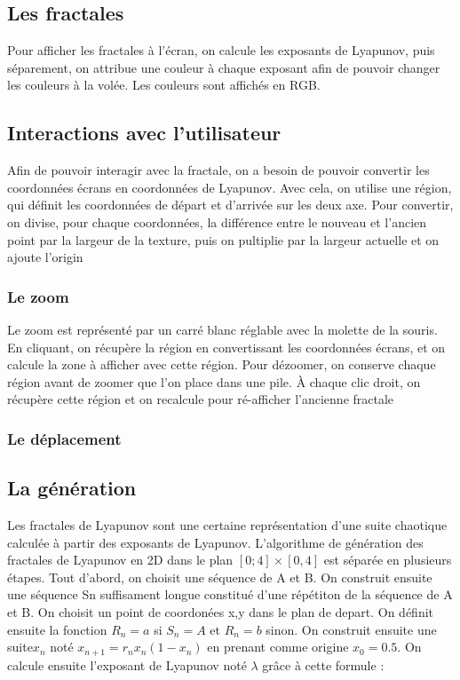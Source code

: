 \documentclass{article}
\begin{document}
    \subsection*{Les fractales}

    Pour afficher les fractales à l'écran, on calcule les exposants de Lyapunov, puis séparement, on attribue une couleur à chaque exposant afin de pouvoir changer les couleurs à la volée.
    Les couleurs sont affichés en RGB.

    \subsection*{Interactions avec l'utilisateur}

    Afin de pouvoir interagir avec la fractale, on a besoin de pouvoir convertir les coordonnées écrans en coordonnées de Lyapunov.
    Avec cela, on utilise une région, qui définit les coordonnées de départ et d'arrivée sur les deux axe.
    Pour convertir, on divise, pour chaque coordonnées, la différence entre le nouveau et l'ancien point par la largeur de la texture, puis on pultiplie par la largeur actuelle et on ajoute l'origin

    \subsubsection*{Le zoom}

    Le zoom est représenté par un carré blanc réglable avec la molette de la souris.
    En cliquant, on récupère la région en convertissant les coordonnées écrans, et on calcule la zone à afficher avec cette région.
    Pour dézoomer, on conserve chaque région avant de zoomer que l'on place dans une pile.
    À chaque clic droit, on récupère cette région et on recalcule pour ré-afficher l'ancienne fractale

    \subsubsection*{Le déplacement}

    \subsection*{La génération}
Les fractales de Lyapunov sont une certaine représentation d'une suite chaotique calculée à partir des exposants de Lyapunov.
 L'algorithme de génération des fractales de Lyapunov en 2D dans le plan $[0;4] \times [0,4]$ est séparée en plusieurs étapes. Tout d'abord, on choisit une séquence de A et B.
 On construit ensuite une séquence Sn suffisament longue constitué d'une répétiton de la séquence de A et B.
 On choisit un point de coordonées x,y dans le plan de depart.
 On définit ensuite la fonction $R_n = a$ si $ S_n = A $ et $R_n = b$ sinon.
On construit ensuite une suite$x_n$ noté $x_{{n+1}}=r_{n}x_{n}(1-x_{n})$ en prenant comme origine $x_0 = 0.5$.
On calcule ensuite l'exposant de Lyapunov noté $\lambda$ grâce à cette formule :
\end{document}
